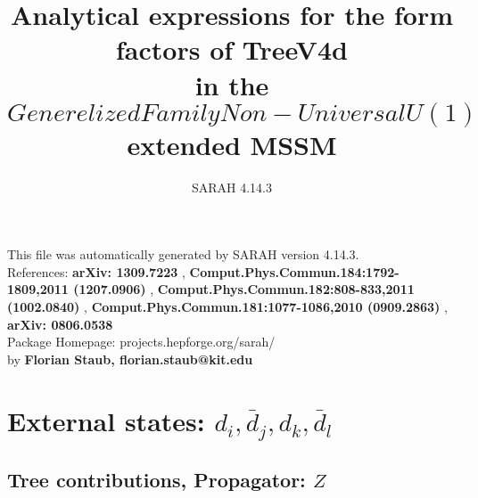 \documentclass[A4,landscape]{article}
\begin{document}
\title{Analytical expressions for the form factors of TreeV4d\\ in the $Generelized Family Non-Universal U(1)$ extended MSSM } 
 \author{SARAH 4.14.3} 
 \maketitle 
 \vspace{10cm} 
This file was automatically generated by SARAH version 4.14.3.  \\ 
References: {\bf arXiv: 1309.7223 }, {\bf Comput.Phys.Commun.184:1792-1809,2011 (1207.0906) }, {\bf Comput.Phys.Commun.182:808-833,2011 (1002.0840) }, {\bf Comput.Phys.Commun.181:1077-1086,2010 (0909.2863) }, {\bf arXiv: 0806.0538 } \\ 
Package Homepage: projects.hepforge.org/sarah/ \\ 
by {\bf Florian Staub, florian.staub@kit.edu} 
 \pagebreak 
 \tableofcontents 
 \pagebreak 
\section{External states: ${d_{{i}}, \bar{d}_{{j}}, d_{{k}}, \bar{d}_{{l}}}$} 
\subsection{Tree contributions, Propagator: $Z$} 
\end{document}
